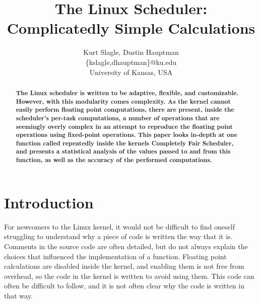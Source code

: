 \documentclass[10pt, conference]{IEEEtran}
\begin{document}
\title{The Linux Scheduler: Complicatedly Simple Calculations}
\author{Kurt Slagle, Dustin Hauptman\\
\{kslagle,dhauptman\}@ku.edu\\
University of Kansas, USA\\ 
}

\maketitle
\thispagestyle{empty}
\begin{abstract}

\textbf{The Linux scheduler is written to be adaptive, flexible, and customizable.  However, with this modularity comes complexity.  As the kernel cannot easily perform floating point computations, there are present, inside the scheduler's per-task computations, a number of operations that are seemingly overly complex in an attempt to reproduce the floating point operations using fixed-point operations.  This paper looks in-depth at one function called repeatedly inside the kernels Completely Fair Scheduler, and presents a statistical analysis of the values passed to and from this function, as well as the accuracy of the performed computations.}

\end{abstract}


\section{Introduction}


For newcomers to the Linux kernel, it would not be difficult to find oneself struggling to understand why a piece of code is written the way that it is.  Comments in the source code are often detailed, but do not always explain the choices that influenced the implementation of a function.  Floating point calculations are disabled inside the kernel, and enabling them is not free from overhead, so the code in the kernel is written to avoid using them.  This code can often be difficult to follow, and it is not often clear why the code is written in that way.
\end{document}
